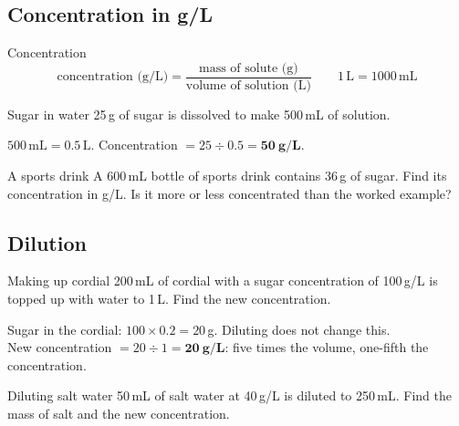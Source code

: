 \label{theory:2}

\subsection{Concentration in g/L}\label{sub:a2.1}

\begin{skillbox}{Concentration}
\[ \text{concentration (g/L)} = \frac{\text{mass of solute (g)}}{\text{volume of solution (L)}} \qquad 1\,\text{L} = 1000\,\text{mL} \]
\end{skillbox}

\begin{workedex}{Sugar in water}
25\,g of sugar is dissolved to make 500\,mL of solution.

\smallskip
$500\,\text{mL} = 0.5\,\text{L}$. \quad Concentration $= 25 \div 0.5 = \mathbf{50\ g/L}$.
\end{workedex}

\begin{wedo}{A sports drink}
A 600\,mL bottle of sports drink contains 36\,g of sugar. Find its concentration in g/L. Is it more or less concentrated than the worked example?
\workbox{4cm}
\end{wedo}

\subsection{Dilution}\label{sub:a2.2}

\begin{workedex}{Making up cordial}
200\,mL of cordial with a sugar concentration of 100\,g/L is topped up with water to 1\,L. Find the new concentration.

\smallskip
Sugar in the cordial: $100 \times 0.2 = 20$\,g. Diluting does not change this.\\
New concentration $= 20 \div 1 = \mathbf{20\ g/L}$: five times the volume, one-fifth the concentration.
\end{workedex}

\begin{wedo}{Diluting salt water}
50\,mL of salt water at 40\,g/L is diluted to 250\,mL. Find the mass of salt and the new concentration.
\workbox{4.5cm}
\end{wedo}

\label{prac:2}



